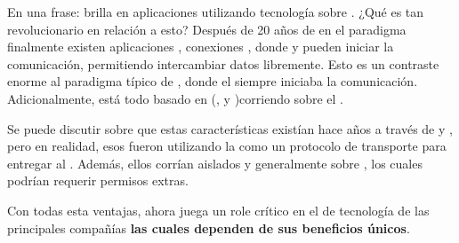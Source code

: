 En una frase: \nodejsNAME brilla en aplicaciones \web \realTimeINT utilizando tecnología \pushINT sobre \websocketsINT. ¿Qué es tan revolucionario en relación a esto? Después de 20 años de \statelessWebINT en el paradigma \requestResponseINT finalmente existen aplicaciones \web \realTimeINT, conexiones \twoWayINT, donde \clientAS y \serverAS pueden iniciar la comunicación, permitiendo intercambiar datos libremente. Esto es un contraste enorme al paradigma típico de \webResponseINT, donde el \clientAS siempre iniciaba la comunicación. Adicionalmente, está todo basado en \openWebStackINT (\htmlNAME, \cssNAME y \javaScriptNAME )corriendo sobre el .

Se puede discutir sobre que estas características existían hace años a través de \flashNAME y \javaAppletsINT, pero en realidad, esos fueron \sandboxedEnvPL utilizando la \web como un protocolo de transporte para entregar al \clientAS. Además, ellos corrían aislados y generalmente sobre \nonStandardPortsINT, los cuales podrían requerir permisos extras.

Con todas esta ventajas, \nodejsNAME ahora juega un role crítico en el \stack de tecnología de las principales compañías \highProfileCPT \cite{online_nodejs_highprofilecompanies} \textbf{las cuales dependen de sus beneficios únicos}.


